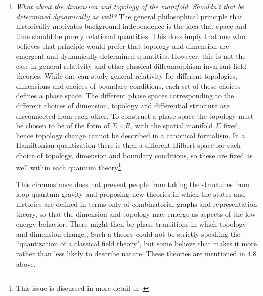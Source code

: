 \documentclass[12pt]{article}
\begin{document}
\begin{enumerate}
\item{}{\it What about the dimension and topology of the manifold. Shouldn't that be
determined dynamically as well?}  The general philosophical principle that historically
motivates background independence is the idea that space and time should be purely
relational quantities. This does imply that one who believes that principle would prefer
that topology and dimension are emergent and dynamically determined quantities.
However, this is not the case in general relativity and other classical diffeomorphism
invariant field theories. While one can study general relativity for different topologies,
dimensions and choices of boundary conditions, each set of these choices defines a
phase space. The different phase spaces corresponding to the different choices of dimension,
topology and differential structure are disconnected from each other.  To construct a phase
space the topology must be chosen to be of the form of $\Sigma \times R$, with 
the spatial manifold $\Sigma$ fixed, hence topology change cannot be described in
a canonical formalism. In a Hamiltonian quantization there is then a different Hilbert 
space for each choice of topology, dimension and boundary conditions, so these are fixed
as well within each quantum theory\footnote{This issue is discussed in 
more detail in \cite{background}.}.

This circumstance does not prevent people from taking the structures from loop quantum
gravity and proposing new theories in which the states and histories are defined in
terms only of combinatorial graphs and representation theory, so that the dimension
and topology may emerge as aspects of the low energy behavior.  There might
then be phase transitions in which topology and dimension change., Such a theory could
not be strictly speaking the ``quantization of a classical field theory", but some believe
that makes it more rather than less likely to describe nature. These theories are
mentioned in 4.8 above. 



\end{enumerate}
\end{document}
